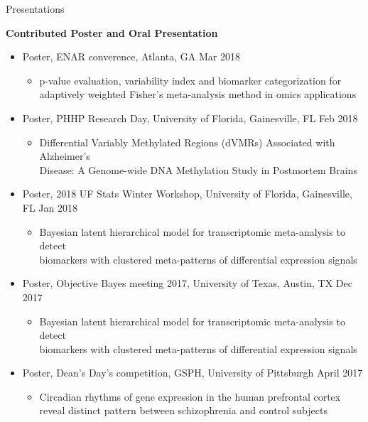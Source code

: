\documentclass{resume} %
\begin{document}
\begin{rSection}{Presentations}
\begin{itemize}[noitemsep,topsep=0pt]
\end{itemize}


\textbf{Contributed Poster and Oral Presentation}

\begin{itemize}[noitemsep,topsep=0pt]


\item  Poster, ENAR converence, Atlanta, GA \hfill {Mar 2018}
\begin{itemize}[noitemsep,topsep=0pt]
\item{p-value evaluation, variability index and biomarker categorization for \\adaptively
weighted Fisher's meta-analysis method in omics applications}
\end{itemize}

\item Poster, PHHP Research Day, University of Florida, Gainesville, FL \hfill {Feb 2018}
\begin{itemize}[noitemsep,topsep=0pt]
\item{Differential Variably Methylated Regions (dVMRs) Associated with Alzheimer's \\Disease: A Genome-wide DNA Methylation Study in Postmortem Brains}
\end{itemize}


\item  Poster, 2018 UF Stats Winter Workshop, University of Florida, Gainesville, FL \hfill {Jan 2018}
\begin{itemize}[noitemsep,topsep=0pt]
\item{Bayesian latent hierarchical model for transcriptomic meta-analysis to detect\\ biomarkers with clustered meta-patterns of differential expression signals}
\end{itemize}

\item  Poster, Objective Bayes meeting 2017, University of Texas, Austin, TX \hfill {Dec 2017}
\begin{itemize}[noitemsep,topsep=0pt]
\item{Bayesian latent hierarchical model for transcriptomic meta-analysis to detect\\ biomarkers with clustered meta-patterns of differential expression signals}
\end{itemize}

\item  Poster, Dean's Day's competition, GSPH, University of Pittsburgh \hfill {April 2017}
\begin{itemize}[noitemsep,topsep=0pt]
\item{Circadian rhythms of gene expression in the human prefrontal cortex \\reveal distinct pattern between schizophrenia and control subjects}
\end{itemize}


\end{itemize}
\end{rSection}
\end{document}
